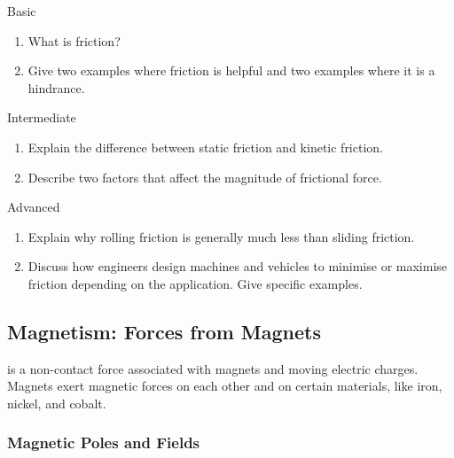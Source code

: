 \begin{tieredquestions}{Basic}
\begin{enumerate}
    \item What is friction?
    \item Give two examples where friction is helpful and two examples where it is a hindrance.
\end{enumerate}
\end{tieredquestions}

\begin{tieredquestions}{Intermediate}
\begin{enumerate}
    \item Explain the difference between static friction and kinetic friction.
    \item Describe two factors that affect the magnitude of frictional force.
\end{enumerate}
\end{tieredquestions}

\begin{tieredquestions}{Advanced}
\begin{enumerate}
    \item  Explain why rolling friction is generally much less than sliding friction.
    \item  Discuss how engineers design machines and vehicles to minimise or maximise friction depending on the application. Give specific examples.
\end{enumerate}
\end{tieredquestions}


\subsection{Magnetism: Forces from Magnets}

\begin{marginnote}
\end{marginnote}
 is a non-contact force associated with magnets and moving electric charges.  Magnets exert magnetic forces on each other and on certain materials, like iron, nickel, and cobalt.

\subsubsection{Magnetic Poles and Fields}

